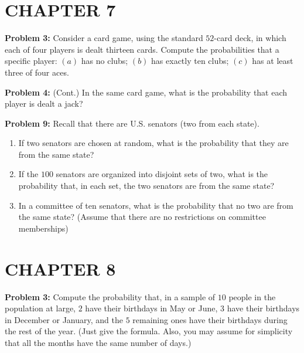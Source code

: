 \documentclass[12pt]{article}
\begin{document}
\section*{CHAPTER 7}

\noindent
\textbf{Problem 3:} Consider a card game, using the standard $52$-card deck, in which each of four players is dealt thirteen cards. Compute the probabilities that a specific player: $(a)$ has no clubs; $(b)$ has exactly ten clubs; $(c)$ has at least three of four aces.

\vspace*{5cm}

\noindent
\textbf{Problem 4:} (Cont.) In the same card game, what is the probability that each player is dealt a jack?

\vspace*{5cm}

\noindent
\textbf{Problem 9:} Recall that there are U.S. senators (two from each state).

\begin{enumerate}[label=(\roman*)]
\item If two senators are chosen at random, what is the probability that they are from the same state?
\item If the $100$ senators are organized into disjoint sets of two, what is the probability that, in each set, the two senators are from the same state?
\item In a committee of ten senators, what is the probability that no two are from the same state? (Assume that there are no restrictions on committee memberships)
\end{enumerate}

\vspace*{3cm}

\section*{CHAPTER 8}

\noindent
\textbf{Problem 3:} Compute the probability that, in a sample of $10$ people in the population at large, $2$ have their birthdays in May or June, $3$ have their birthdays in December or January, and the $5$  remaining ones have their birthdays during the rest of the year. (Just give the formula. Also, you may assume for simplicity that all the months have the same number of days.)
\end{document}
